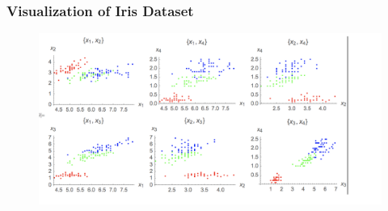 \documentclass{beamer}
\begin{document}
\begin{frame}
\frametitle{Visualization of Iris Dataset}
\begin{figure}[t]
\includegraphics[scale=0.5]{graphics/feature_vis}
\centering
\end{figure}
\end{frame}
\end{document}
